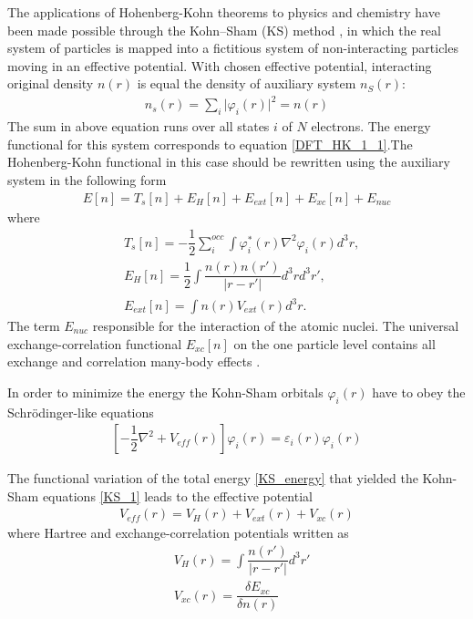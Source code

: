 The applications of Hohenberg-Kohn theorems to physics and chemistry have been made possible through the Kohn–Sham (KS) method \citep{PhysRev.140.A1133}, in which the real system of particles is mapped into a fictitious system of non-interacting particles moving in an effective potential.
With chosen effective potential, interacting original density $n(r)$ is equal the density of auxiliary system $n_S(r)$:
\begin{align}
n_s(r)=\sum_i \vert \varphi_{i}(r) \vert^2=n(r)
\label{KS_spinors_1}
\end{align}
The sum in above equation runs over all states $i$ of $N$ electrons. The energy functional for this system corresponds to equation \eqref{DFT_HK_1_1}.The Hohenberg-Kohn functional in this case should be rewritten using the auxiliary system in the following form
\begin{align}
E[n]=T_s[n]+E_H[n]+E_{ext}[n]+E_{xc}[n]+E_{nuc}
\label{KS_energy}
\end{align}
where
\begin{subequations}
\begin{align}
\label{kinetic_KS}
&
T_s[n]=-\dfrac{1}{2} \sum_i^{occ} \int \varphi^*_i(r)\nabla^2 \varphi_i(r) d^3r,
\\
&
\label{Hartree_KS}
E_H[n]=\dfrac{1}{2} \int \dfrac{n(r)n(r')}{\vert r-r'\vert }d^3rd^3r',
\\
\label{ext_KS}
&
E_{ext}[n]=\int n(r) V_{ext}(r)d^3r.
\end{align}
\end{subequations}
The term $E_{nuc}$ responsible for the interaction of the atomic nuclei. The universal exchange-correlation functional $E_{xc}[n]$ on the one particle level contains all exchange and correlation many-body effects \citep{RevModPhys.61.689}. 

In order to minimize the energy the Kohn-Sham orbitals $\varphi_i(r)$ have to obey the Schrödinger-like equations
\begin{align}
\left[ -\dfrac{1}{2} \nabla^2 + V_{eff}(r) \right] \varphi_{i}(r)=\varepsilon_{i}(r) \varphi_{i}(r)
\label{KS_1}
\end{align}

The functional variation of the total energy \eqref{KS_energy} that yielded the Kohn-Sham equations \eqref{KS_1} leads to the effective potential
\begin{align}
V_{eff}(r)=V_H(r)+V_{ext}(r)+V_{xc}(r)
\label{KS_potential}
\end{align}
where Hartree and exchange-correlation potentials written as
\begin{subequations}
\begin{align}
\label{KS_potential_VH}
&
V_H(r)=\int \dfrac{n(r')}{\vert r-r'\vert }d^3r'
\\
&
\label{KS_potential_XC}
V_{xc}(r)=\dfrac{\delta E_{xc}}{\delta n (r)}
\end{align}
\end{subequations}

